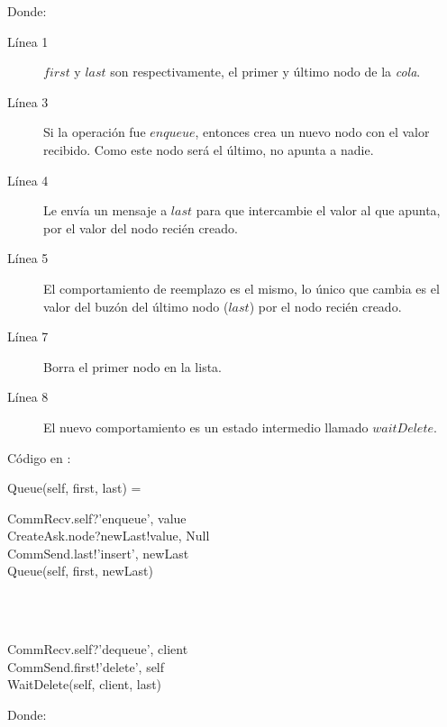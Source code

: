 Donde:

\begin{description}
 \item [Línea 1] $first$ y $last$ son respectivamente, el primer y último nodo de la \textit{cola}.
 \item [Línea 3] Si la operación fue $enqueue$, entonces crea un nuevo nodo con el valor recibido. Como este nodo será el último, no apunta a nadie.
 \item [Línea 4] Le envía un mensaje a $last$ para que intercambie el valor al que apunta, por el valor del nodo recién creado.
 \item [Línea 5] El comportamiento de reemplazo es el mismo, lo único que cambia es el valor del buzón del último nodo ($last$) por el nodo recién creado.
 \item [Línea 7] Borra el primer nodo en la lista.
 \item [Línea 8] El nuevo comportamiento es un estado intermedio llamado $waitDelete$.
\end{description}

Código en \CSP:

\begin{process}
Queue(self, first, last) = \\ \quad
  \begin{block}
  CommRecv.self?\langle 'enqueue', value \rangle \then \\
  CreateAsk.node?newLast!\langle value, Null \rangle \then \\
  CommSend.last!\langle 'insert', newLast \rangle \then \\
  Queue(self, first, newLast)
  \end{block} \\

  \Extchoice \\ \quad
  
  \begin{block}
  CommRecv.self?\langle 'dequeue', client \rangle \then \\
  CommSend.first!\langle 'delete', self \rangle \then \\
  WaitDelete(self, client, last)
  \end{block} 
\end{process}

Donde:

